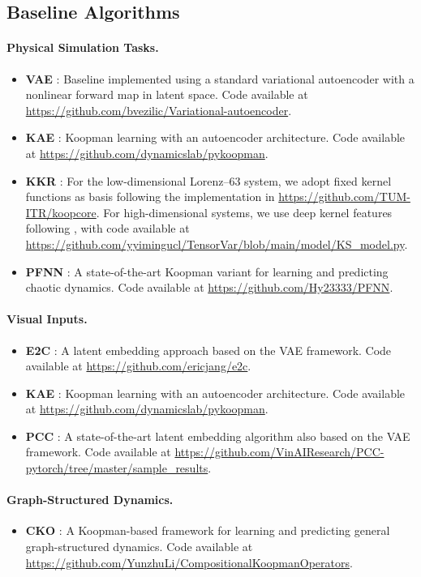 \documentclass{article} %
\begin{document}
\clearpage
\subsection{Baseline Algorithms}
\paragraph{Physical Simulation Tasks.}
\begin{itemize}
    \item \textbf{VAE} \citep{kingma2013auto}: Baseline implemented using a standard variational autoencoder with a nonlinear forward map in latent space. Code available at \url{https://github.com/bvezilic/Variational-autoencoder}.
    \item \textbf{KAE} \citep{pan2023pykoopman}: Koopman learning with an autoencoder architecture. Code available at \url{https://github.com/dynamicslab/pykoopman}.
    \item \textbf{KKR} \citep{bevanda2023koopman}: For the low-dimensional Lorenz–63 system, we adopt fixed kernel functions as basis following the implementation in \url{https://github.com/TUM-ITR/koopcore}. For high-dimensional systems, we use deep kernel features following \citet{yangtensor}, with code available at \url{https://github.com/yyimingucl/TensorVar/blob/main/model/KS_model.py}.
    \item \textbf{PFNN} \citep{cheng2025learning}: A state-of-the-art Koopman variant for learning and predicting chaotic dynamics. Code available at \url{https://github.com/Hy23333/PFNN}.
\end{itemize}

\paragraph{Visual Inputs.}
\begin{itemize}
    \item \textbf{E2C} \citep{banijamali2018robust}: A latent embedding approach based on the VAE framework. Code available at \url{https://github.com/ericjang/e2c}.
    \item \textbf{KAE} \citep{pan2023pykoopman}: Koopman learning with an autoencoder architecture. Code available at \url{https://github.com/dynamicslab/pykoopman}.
    \item \textbf{PCC} \citep{banijamali2018robust}: A state-of-the-art latent embedding algorithm also based on the VAE framework. Code available at \url{https://github.com/VinAIResearch/PCC-pytorch/tree/master/sample_results}.
\end{itemize}

\paragraph{Graph-Structured Dynamics.}
\begin{itemize}
    \item \textbf{CKO} \citep{li2019learning}: A Koopman-based framework for learning and predicting general graph-structured dynamics. Code available at \url{https://github.com/YunzhuLi/CompositionalKoopmanOperators}.
\end{itemize}
\end{document}
